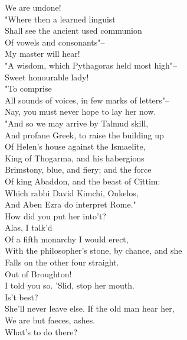 \documentclass{memoir}
\begin{document}
\begin{drama*}
 We are undone!\\
\dolspeaks {} "Where then a learned linguist\\
 Shall see the ancient used communion\\
 Of vowels and consonants"--\\
\facespeaks {} My master will hear!\\
\dolspeaks  "A wisdom, which Pythagoras held most high"--\\
\mammonspeaks  Sweet honourable lady!\\
\dolspeaks {} "To comprise\\
 All sounds of voices, in few marks of letters"--\\
\facespeaks  Nay, you must never hope to lay her now.\\
\dolspeaks  "And so we may arrive by Talmud skill,\\
 And profane Greek, to raise the building up\\
 Of Helen's house against the Ismaelite,\\
 King of Thogarma, and his habergions\\
 Brimstony, blue, and fiery; and the force\\
 Of king Abaddon, and the beast of Cittim:\\
 Which rabbi David Kimchi, Onkelos,\\
 And Aben Ezra do interpret Rome."\\
\facespeaks  How did you put her into't?\\
\mammonspeaks {} Alas, I talk'd\\
 Of a fifth monarchy I would erect,\\
 With the philosopher's stone, by chance, and she\\
 Falls on the other four straight.\\
\facespeaks {} Out of Broughton!\\
 I told you so. 'Slid, stop her mouth.\\
\mammonspeaks {} Is't best?\\
\facespeaks  She'll never leave else. If the old man hear her,\\
 We are but faeces, ashes.\\
\subtlespeaks {} What's to do there?\\

\end{drama*}
\end{document}
